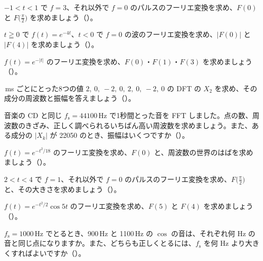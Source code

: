 \bkproblem $-1<t<1$ で $f=3$、それ以外で $f=0$ のパルスのフーリエ変換を求め、$F(0)$ と $F\bigl(\frac{\pi}{2}\bigr)$ を求めましょう\mbox{（）}。

\bkproblem $t\geqq0$ で $f(t)=e^{-4t}$、$t<0$ で $f=0$ の波のフーリエ変換を求め、$|F(0)|$ と $|F(4)|$ を求めましょう\mbox{（）}。

\bkproblem $f(t)=e^{-|t|}$ のフーリエ変換を求め、$F(0)$・$F(1)$・$F(3)$ を求めましょう\mbox{（）}。

\,ms ごとにとった8つの値 $2,\ 0,\ -2,\ 0,\ 2,\ 0,\ -2,\ 0$ の DFT の $X_2$ を求め、その成分の周波数と振幅を答えましょう\mbox{（）}。

\bkproblem 音楽の CD と同じ $f_{\mathrm s}=\num{44100}$\,Hz で1秒間とった音を FFT しました。点の数、周波数のきざみ、正しく調べられるいちばん高い周波数を求めましょう。また、ある成分の $|X_k|$ が \num{22050} のとき、振幅はいくつですか\mbox{（）}。


\bkproblem $f(t)=e^{-t^2/18}$ のフーリエ変換を求め、$F(0)$ と、周波数の世界のはばを求めましょう\mbox{（）}。

\bkproblem $2<t<4$ で $f=1$、それ以外で $f=0$ のパルスのフーリエ変換を求め、$F\bigl(\frac{\pi}{2}\bigr)$ と、その大きさを求めましょう\mbox{（）}。

\bkproblem $f(t)=e^{-t^2/2}\cos5t$ のフーリエ変換を求め、$F(5)$ と $F(4)$ を求めましょう\mbox{（）}。

\bkproblem $f_{\mathrm s}=1000$\,Hz でとるとき、900\,Hz と 1100\,Hz の $\cos$ の音は、それぞれ何 Hz の音と同じ点になりますか。また、どちらも正しくとるには、$f_{\mathrm s}$ を何 Hz より大きくすればよいですか\mbox{（）}。

